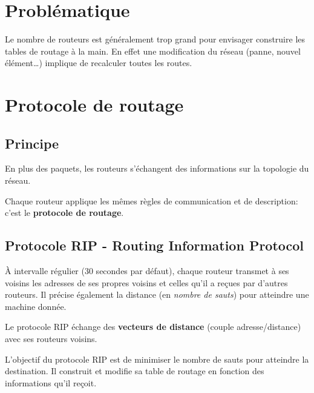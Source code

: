 \documentclass[a4paper,11pt]{article}
\begin{document}
\section{Problématique}
Le nombre de routeurs est généralement trop grand pour envisager construire les tables de routage à la main. En effet une modification du réseau (panne, nouvel élément\dots) implique de recalculer toutes les routes.
\begin{center}
\end{center}
\section{Protocole de routage}
\subsection{Principe}
En plus des paquets, les routeurs s'échangent des informations sur la topologie du réseau. 
\begin{aretenir}[]
    Chaque routeur applique les mêmes règles de communication et de description: c'est le \textbf{protocole de routage}.
\end{aretenir}
\subsection{Protocole RIP - Routing Information Protocol}
À intervalle régulier (30 secondes par défaut), chaque routeur transmet à ses voisins les adresses de ses propres voisins et celles qu'il a reçues par d'autres routeurs. Il précise également la distance (en \emph{nombre de sauts}) pour atteindre une machine donnée.
\begin{aretenir}[]
Le protocole RIP échange des \textbf{vecteurs de distance} (couple adresse/distance) avec ses routeurs voisins.
\end{aretenir}
L'objectif du protocole RIP est de minimiser le nombre de sauts pour atteindre la destination. Il construit et modifie sa table de routage en fonction des informations qu'il reçoit.
\end{document}

